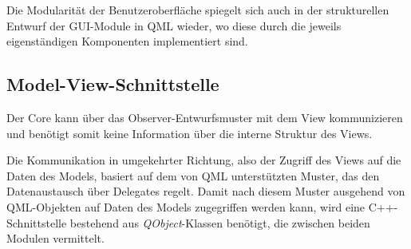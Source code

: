 Die Modularität der Benutzeroberfläche spiegelt sich auch in der strukturellen Entwurf der GUI-Module in QML wieder, wo diese durch die jeweils eigenständigen Komponenten implementiert sind.

\subsection{Model-View-Schnittstelle}

Der Core kann über das Observer-Entwurfsmuster mit dem View kommunizieren und benötigt somit keine Information über die interne Struktur des Views.

Die Kommunikation in umgekehrter Richtung, also der Zugriff des Views auf die Daten des Models, basiert auf dem von QML unterstützten Muster, das den Datenaustausch über Delegates regelt. Damit nach diesem Muster ausgehend von QML-Objekten auf Daten des Models zugegriffen werden kann, wird eine C++-Schnittstelle bestehend aus \textit{QObject}-Klassen benötigt, die zwischen beiden Modulen vermittelt.
